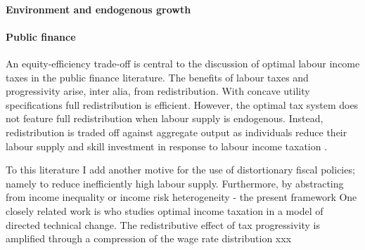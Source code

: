 \paragraph{Environment and endogenous growth}

\paragraph{Public finance}
An equity-efficiency trade-off is central to the discussion of optimal labour income taxes in the public finance literature.  The benefits of labour taxes and progressivity arise, inter alia, from redistribution. %
With concave utility specifications full redistribution is efficient. However, the optimal tax system does not feature full redistribution when labour supply is endogenous. Instead, redistribution is traded off against aggregate output as individuals reduce their labour supply and skill investment in response to labour income taxation \citep{Heathcote2017OptimalFramework, Conesa2009TaxingAll, Domeij2004OnTaxes}.

To this literature I add another motive for the use of distortionary fiscal policies; namely to reduce inefficiently high labour supply. Furthermore, by abstracting from income inequality or income risk heterogeneity - the present framework
One closely related work is \cite{Loebbing2019NationalChange} who studies optimal income taxation in a model of directed technical change. The redistributive effect of tax progressivity is amplified through a compression of the wage rate distribution xxx